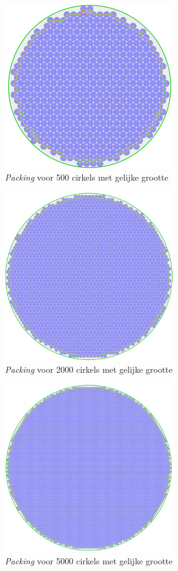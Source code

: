 \documentclass[12pt,a4paper,oneside]{book}
\begin{document}
{\begin{figure}
  \centering
  \includegraphics[width=0.65\textwidth]{packing-even-groot-500.png}
  \caption{\textit{Packing} voor 500 cirkels met gelijke grootte}
\end{figure}

\begin{figure}
  \centering
  \includegraphics[width=0.65\textwidth]{packing-even-groot-2000.png}
  \caption{\textit{Packing} voor 2000 cirkels met gelijke grootte}
\end{figure}

\begin{figure}
  \centering
  \includegraphics[width=0.65\textwidth]{packing-even-groot-5000.png}
  \caption{\textit{Packing} voor 5000 cirkels met gelijke grootte}
\end{figure}

}
\end{document}

